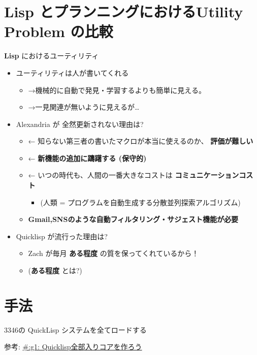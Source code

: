 \section{Lisp とプランニングにおけるUtility Problem の比較}
\label{sec-7}

\textbf{Lisp} におけるユーティリティ

\begin{itemize}
\item ユーティリティは人が書いてくれる
\begin{itemize}
\item →機械的に自動で発見・学習するよりも簡単に見える。
\item →一見関連が無いように見えるが\ldots{}
\end{itemize}
\item Alexandria が 全然更新されない理由は?
\begin{itemize}
\item ← 知らない第三者の書いたマクロが本当に使えるのか、 \textbf{評価が難しい}
\item ← \textbf{新機能の追加に躊躇する (保守的)}
\item ← いつの時代も、人間の一番大きなコストは \textbf{コミュニケーションコスト}
\begin{itemize}
\item (人類 = プログラムを自動生成する分散並列探索アルゴリズム)
\end{itemize}
\item \textbf{Gmail,SNSのような自動フィルタリング・サジェスト機能が必要}
\end{itemize}
\item Quicklisp が流行った理由は?
\begin{itemize}
\item Zach が毎月 \textbf{ある程度} の質を保ってくれているから！
\item (\textbf{ある程度} とは?)
\end{itemize}
\end{itemize}

\section{手法}
\label{sec-8}

3346の QuickLisp システムを全てロードする
\begin{alignright}
\begin{smaller}
参考: \href{http://g000001.cddddr.org/3610010400}{\#:g1: Quicklisp全部入りコアを作ろう}
\end{smaller}
\end{alignright}

